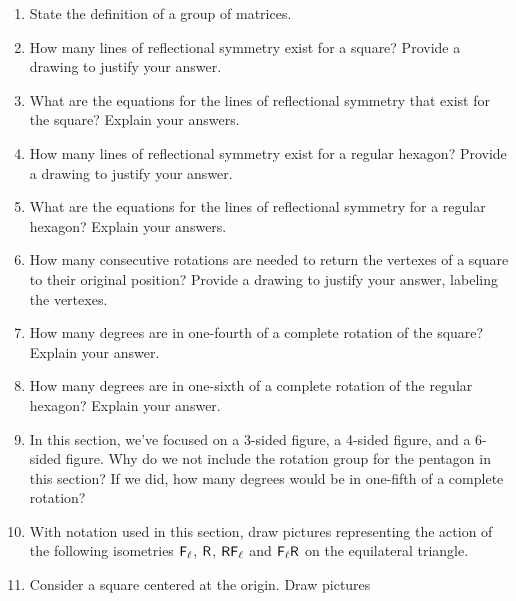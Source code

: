 \begin{problems}
\begin{enumerate}
\item State the definition of a group of matrices.
\item How many lines of reflectional symmetry exist for a square?
  Provide a drawing to justify your answer.
\item What are the equations for the lines of reflectional symmetry that exist for
  the square? Explain your answers.
\item How many lines of reflectional symmetry exist for a regular hexagon?  Provide a
  drawing to justify your answer.
\item What are the equations for the lines of reflectional symmetry
  for a regular hexagon?  Explain your answers.
\item How many consecutive rotations are needed to return the vertexes
  of a square to their original position? Provide a drawing to justify
  your answer, labeling the vertexes.
\item How many degrees are in one-fourth of a complete rotation of the
  square?  Explain your answer.
\item How many degrees are in one-sixth of a complete rotation of the
  regular hexagon?  Explain your answer.
\item In this section, we've focused on a 3-sided figure, a 4-sided
  figure, and a 6-sided figure.  Why do we not include the rotation
  group for the pentagon in this section?  If we did, how many degrees
  would be in one-fifth of a complete rotation?
\item With notation used in this section, draw pictures representing
  the action of the following isometries $\mathsf{F}_\ell$, $\mathsf{R}$,
  $\mathsf{R}\mathsf{F}_\ell$ and $\mathsf{F}_\ell\mathsf{R}$ on the equilateral
  triangle.
\item Consider a square centered at the origin. Draw pictures

\end{enumerate}
\end{problems}
